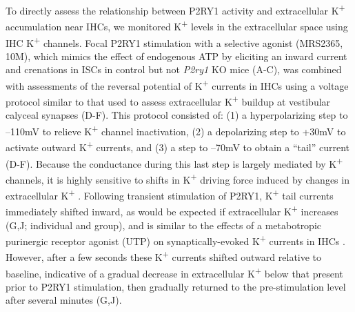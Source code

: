 \documentclass[9pt,lineno]{elife}
\begin{document}
To directly assess the relationship between P2RY1 activity and extracellular K\textsuperscript{+} accumulation near IHCs, we monitored K\textsuperscript{+} levels in the extracellular space using IHC K\textsuperscript{+} channels. Focal P2RY1 stimulation with a selective agonist (MRS2365, 10\textmu M), which mimics the effect of endogenous ATP by eliciting an inward current and crenations in ISCs in control but not \textit{P2ry1} KO mice (A-C), was combined with assessments of the reversal potential of K\textsuperscript{+} currents in IHCs using a voltage protocol similar to that used to assess extracellular K\textsuperscript{+} buildup at vestibular calyceal synapses \citep{Lim2011} (D-F). This protocol consisted of: (1) a hyperpolarizing step to --110mV to relieve K\textsuperscript{+} channel inactivation, (2) a depolarizing step to +30mV to activate outward K\textsuperscript{+} currents, and (3) a step to --70mV to obtain a ``tail'' current (D-F). Because the conductance during this last step is largely mediated by K\textsuperscript{+} channels, it is highly sensitive to shifts in K\textsuperscript{+} driving force induced by changes in extracellular K\textsuperscript{+} \citep{Contini2017,Lim2011}. Following transient stimulation of P2RY1, K\textsuperscript{+} tail currents immediately shifted inward, as would be expected if extracellular K\textsuperscript{+} increases (G,J; individual and group), and is similar to the effects of a metabotropic purinergic receptor agonist (UTP) on synaptically-evoked K\textsuperscript{+} currents in IHCs \citep{Wang2015}. However, after a few seconds these K\textsuperscript{+} currents shifted outward relative to baseline, indicative of a gradual decrease in extracellular K\textsuperscript{+} below that present prior to P2RY1 stimulation, then gradually returned to the pre-stimulation level after several minutes (G,J). 
\end{document}
